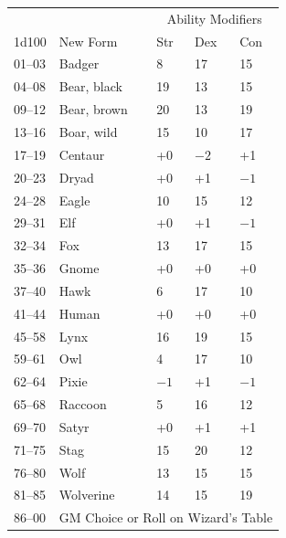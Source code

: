 \begin{multicols}{2}
\begin{minipage}{\columnwidth}
\noindent
{}
\begin{tabular}{|p{}|p{}|p{}|p{}|p{}|}
\hline
\multicolumn{2}{|c|}{ }	& \multicolumn{3}{c|}{Ability Modifiers} \\
1d100	& New Form	& Str	& Dex	& Con \\
\hline\hline
\rowcolor[gray]{0.9}01--03	& Badger	& 8	& 17	& 15 \\
04--08	& Bear, black	& 19	& 13	& 15 \\
\rowcolor[gray]{0.9}09--12	& Bear, brown	& 20	& 13	& 19 \\
13--16	& Boar, wild	& 15	& 10	& 17 \\
\rowcolor[gray]{0.9}17--19	& Centaur	& +0	& $-2$	& +1 \\
20--23	& Dryad	& +0	& +1	& $-1$ \\
\rowcolor[gray]{0.9}24--28	& Eagle	& 10	& 15	& 12 \\
29--31	& Elf	& +0	& +1	& $-1$ \\
\rowcolor[gray]{0.9}32--34	& Fox	& 13	& 17	& 15 \\
35--36	& Gnome	& +0	& +0	& +0 \\
\rowcolor[gray]{0.9}37--40	& Hawk	& 6	& 17	& 10 \\
41--44	& Human	& +0	& +0	& +0 \\
\rowcolor[gray]{0.9}45--58	& Lynx	& 16	& 19	& 15 \\
59--61	& Owl	& 4	& 17	& 10 \\
\rowcolor[gray]{0.9}62--64	& Pixie	& $-1$	& +1	& $-1$ \\
65--68	& Raccoon	& 5	& 16	& 12 \\
\rowcolor[gray]{0.9}69--70	& Satyr	& +0	& +1	& +1 \\
71--75	& Stag	& 15	& 20	& 12 \\
\rowcolor[gray]{0.9}76--80	& Wolf	& 13	& 15	& 15 \\
81--85	& Wolverine	& 14	& 15	& 19 \\
\rowcolor[gray]{0.9}86--00	& \multicolumn{4}{c|}{GM Choice or Roll on Wizard's Table} \\
\hline
\end{tabular}

\end{minipage}

\noindent
\begin{minipage}{\columnwidth}


\end{minipage}
\end{multicols}
